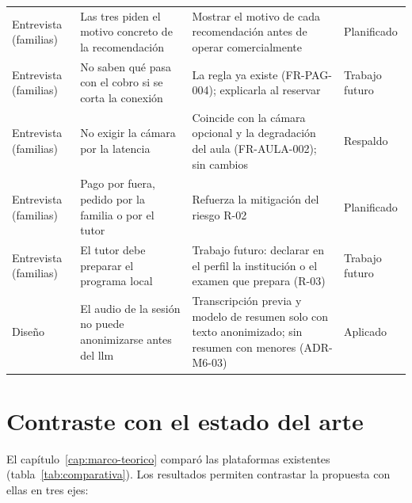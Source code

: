 {\begin{xltabular}{\textwidth}{>{\raggedright\arraybackslash}p{2.1cm} L L >{\raggedright\arraybackslash}p{2.6cm}}
        Entrevista (familias) & Las tres piden el motivo concreto de la recomendación & Mostrar el motivo de cada recomendación antes de operar comercialmente & Planificado \\
        Entrevista (familias) & No saben qué pasa con el cobro si se corta la conexión & La regla ya existe (FR-PAG-004); explicarla al reservar & Trabajo futuro \\
        Entrevista (familias) & No exigir la cámara por la latencia & Coincide con la cámara opcional y la degradación del aula (FR-AULA-002); sin cambios & Respaldo \\
        Entrevista (familias) & Pago por fuera, pedido por la familia o por el tutor & Refuerza la mitigación del riesgo R-02 & Planificado \\
        Entrevista (familias) & El tutor debe preparar el programa local & Trabajo futuro: declarar en el perfil la institución o el examen que prepara (R-03) & Trabajo futuro \\
        Diseño & El audio de la sesión no puede anonimizarse antes del \gls{llm} & Transcripción previa y modelo de resumen solo con texto anonimizado; sin resumen con menores (ADR-M6-03) & Aplicado \\
\end{xltabular}
}

\section{Contraste con el estado del arte}

El capítulo~\ref{cap:marco-teorico} comparó las plataformas existentes
(tabla~\ref{tab:comparativa}). Los resultados permiten contrastar la
propuesta con ellas en tres ejes:

